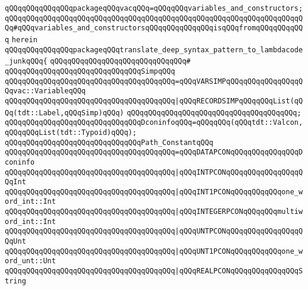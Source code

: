 \verb|qQQqqQQqqQQqqQQqpackageqQQqvacqQQq=qQQqqQQqvariables_and_constructors;qQQqqQQqqQQqqQQqqQQqqQQqqQQqqQQqqQQqqQQqqQQqqQQqqQQqqQQqqQQqqQQqqQQqqQQq#qQQqvariables_and_constructorsqQQqqQQqqQQqqQQqisqQQqfromqQQqqQQqqQQq|\newline
\verb|herein|\newline
\newline
\verb|qQQqqQQqqQQqqQQqpackageqQQqtranslate_deep_syntax_pattern_to_lambdacode_junkqQQq{|\newline
\verb|qQQqqQQqqQQqqQQqqQQqqQQqqQQqqQQq#|\newline
\newline
\verb|qQQqqQQqqQQqqQQqqQQqqQQqqQQqqQQqSimpqQQq|\newline
\verb|qQQqqQQqqQQqqQQqqQQqqQQqqQQqqQQqqQQqqQQq=qQQqVARSIMPqQQqqQQqqQQqqQQqqQQqvac::VariableqQQq|\newline
\verb|qQQqqQQqqQQqqQQqqQQqqQQqqQQqqQQqqQQqqQQq|\verb#|qQQqRECORDSIMPqQQqqQQqList(qQQq(tdt::Label,qQQqSimp)qQQq)#\newline
\verb|qQQqqQQqqQQqqQQqqQQqqQQqqQQqqQQqqQQqqQQq;|\newline
\newline
\verb|qQQqqQQqqQQqqQQqqQQqqQQqqQQqqQQqDconinfoqQQq=qQQqqQQq(qQQqtdt::Valcon,qQQqqQQqList(tdt::Typoid)qQQq);|\newline
\newline
\verb|qQQqqQQqqQQqqQQqqQQqqQQqqQQqqQQqPath_ConstantqQQq|\newline
\verb|qQQqqQQqqQQqqQQqqQQqqQQqqQQqqQQqqQQqqQQq=qQQqDATAPCONqQQqqQQqqQQqqQQqDconinfo|\newline
\verb|qQQqqQQqqQQqqQQqqQQqqQQqqQQqqQQqqQQqqQQq|\verb#|qQQqINTPCONqQQqqQQqqQQqqQQqqQQqInt#\newline
\verb|qQQqqQQqqQQqqQQqqQQqqQQqqQQqqQQqqQQqqQQq|\verb#|qQQqINT1PCONqQQqqQQqqQQqone_word_int::Int#\newline
\verb|qQQqqQQqqQQqqQQqqQQqqQQqqQQqqQQqqQQqqQQq|\verb#|qQQqINTEGERPCONqQQqqQQqmultiword_int::Int#\newline
\verb|qQQqqQQqqQQqqQQqqQQqqQQqqQQqqQQqqQQqqQQq|\verb#|qQQqUNTPCONqQQqqQQqqQQqqQQqqQQqUnt#\newline
\verb|qQQqqQQqqQQqqQQqqQQqqQQqqQQqqQQqqQQqqQQq|\verb#|qQQqUNT1PCONqQQqqQQqqQQqone_word_unt::Unt#\newline
\verb|qQQqqQQqqQQqqQQqqQQqqQQqqQQqqQQqqQQqqQQq|\verb#|qQQqREALPCONqQQqqQQqqQQqqQQqString#\newline
